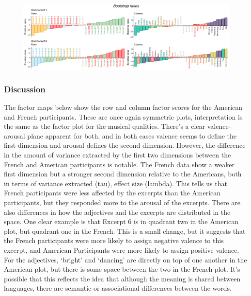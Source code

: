 \documentclass[
  english,
  man,floatsintext]{apa6}
\begin{document}
\begin{figure}

{\centering \includegraphics{Music-Descriptor-Space_files/figure-latex/thebootsA-1} 

}

\caption{ }\label{fig:thebootsA}
\end{figure}

\hypertarget{discussion-1}{%
\subsubsection{Discussion}\label{discussion-1}}

The factor maps below show the row and column factor scores for the American and French participants. These are once again symmetric plots, interpretation is the same as the factor plot for the musical qualities. There's a clear valence-arousal plane apparent for both, and in both cases valence seems to define the first dimension and arousal defines the second dimension. However, the difference in the amount of variance extracted by the first two dimensions between the French and American participants is notable. The French data show a weaker first dimension but a stronger second dimension relative to the Americans, both in terms of variance extracted (tau), effect size (lambda). This tells us that French participants were less affected by the excerpts than the American participants, but they responded more to the arousal of the excerpts.
There are also differences in how the adjectives and the excerpts are distributed in the space. One clear example is that Excerpt 6 is in quadrant two in the American plot, but quadrant one in the French. This is a small change, but it suggests that the French participants were more likely to assign negative valence to this excerpt, and American Participants were more likely to assign positive valence. For the adjectives, `bright' and `dancing' are directly on top of one another in the American plot, but there is some space between the two in the French plot. It's possible that this reflects the idea that although the meaning is shared between languages, there are semantic or associational differences between the words.
\end{document}
